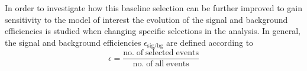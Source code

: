 In order to investigate how this baseline selection can be further improved to gain sensitivity to the model of interest the evolution of the signal and background efficiencies is studied when changing specific selections in the analysis. In general, the signal and background efficiencies $\epsilon_\mathrm{sig/bg}$ are defined according to
\begin{equation}
\epsilon = \frac{\mathrm{no. \; of \; selected \; events}}{\mathrm{no. \; of \; all \; events}}
\end{equation} 

\begin{figure}[!t]
  \centering
{}
\end{figure}
